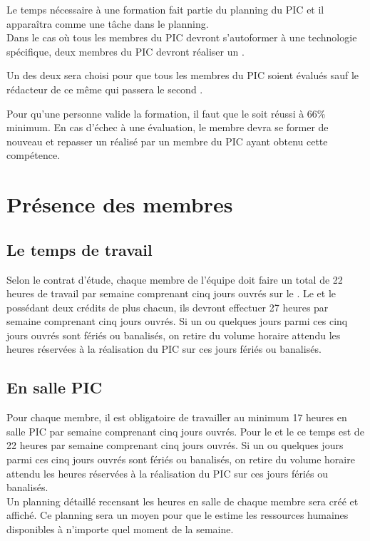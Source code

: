 Le temps nécessaire à une formation fait partie du planning du PIC et il apparaîtra comme une tâche dans le planning. \\

Dans le cas où tous les membres du PIC devront s'autoformer à une technologie spécifique, deux membres du PIC devront réaliser un \QCM.

Un des deux \QCMCourt{} sera choisi pour que tous les membres du PIC soient évalués sauf le rédacteur de ce même \QCMCourt{} qui passera le second \QCMCourt.

Pour qu'une personne valide la formation, il faut que le \QCMCourt{} soit réussi à 66\% minimum. En cas d'échec à une évaluation, le membre devra se former de nouveau et repasser un \QCMCourt{} réalisé par un membre du PIC ayant obtenu cette compétence.

\section{Présence des membres}
\label{Présence des membres}

\subsection{Le temps de travail}
\label{temps_de_travail}
Selon le contrat d'étude, chaque membre de l'équipe doit faire un total de 22 heures de travail par semaine comprenant cinq jours ouvrés sur le \PICCourt. Le \CP{} et le \RQ{} possédant deux crédits de plus chacun, ils devront effectuer 27 heures par semaine comprenant cinq jours ouvrés. Si un ou quelques jours parmi ces cinq jours ouvrés sont fériés ou banalisés, on retire du volume horaire attendu les heures réservées à la réalisation du PIC sur ces jours fériés ou banalisés.

\subsection{En salle PIC}
\label{en_salle_pic}
Pour chaque membre, il est obligatoire de travailler au minimum 17 heures en salle PIC par semaine comprenant cinq jours ouvrés. Pour le \CP{} et le \RQ{} ce temps est de 22 heures par semaine comprenant cinq jours ouvrés. Si un ou quelques jours parmi ces cinq jours ouvrés sont fériés ou banalisés, on retire du volume horaire attendu les heures réservées à la réalisation du PIC sur ces jours fériés ou banalisés.\\

Un planning détaillé recensant les heures en salle de chaque membre sera créé et affiché.
Ce planning sera un moyen pour que le \CP{} estime les ressources humaines disponibles à n'importe quel moment de la semaine.

